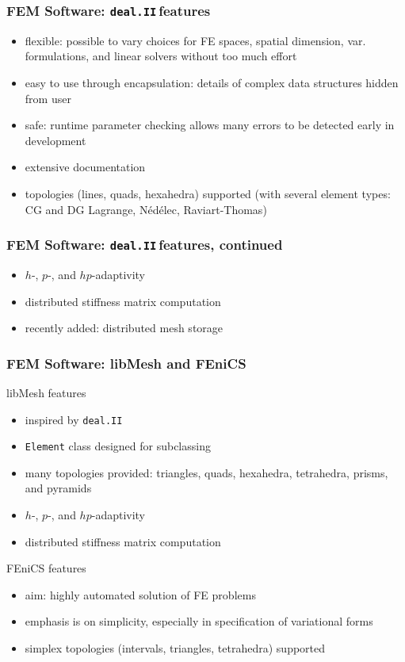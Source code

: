 \documentclass[mathserif]{beamer}
\newcommand{\code}[1]{\texttt{#1}}
\newcommand{\deal}{\code{deal.II}\,}
\newcommand{\pecosbold}[1]{{\color{pecos2}{#1}}}
\newcommand{\FootSize}{\scriptsize}
\begin{document}
\begin{frame}
\frametitle{FEM Software: \deal features}
\begin{block}{}
\begin{itemize}
\item flexible: possible to vary choices for FE spaces, spatial dimension, var. formulations, and linear solvers without too much effort
\item easy to use through encapsulation: details of complex data structures hidden from user
\item safe: runtime parameter checking allows many errors to be detected early in development
\item extensive documentation
\item \pecosbold{hypercube} topologies (lines, quads, hexahedra) supported (with several element types: CG and DG Lagrange, N\'{e}d\'{e}lec, Raviart-Thomas)
\end{itemize}
\end{block}
\end{frame}

\begin{frame}
\frametitle{FEM Software: \deal features, continued}
\begin{block}{}
\begin{itemize}
\item $h$-, $p$-, and $hp$-adaptivity
\item distributed stiffness matrix computation
\item recently added: distributed mesh storage\footnotemark
\end{itemize}
\end{block}\footnotetext{\FootSize \bibentry{dealiiwithp4est}}
\end{frame}

\begin{frame}
\frametitle{FEM Software: libMesh and FEniCS}
\begin{block}{libMesh features}
\begin{itemize}
\item inspired by \deal
\item \code{Element} class designed for subclassing
\item many topologies provided: triangles, quads, hexahedra, tetrahedra, prisms, and pyramids
\item $h$-, $p$-, and $hp$-adaptivity
\item distributed stiffness matrix computation
\end{itemize}
\end{block}

\begin{block}{FEniCS features}
\begin{itemize}
\item aim: highly automated solution of FE problems
\item emphasis is on simplicity, especially in specification of variational forms
\item simplex topologies (intervals, triangles, tetrahedra) supported
\end{itemize}
\end{block}
\end{frame}
\end{document}
